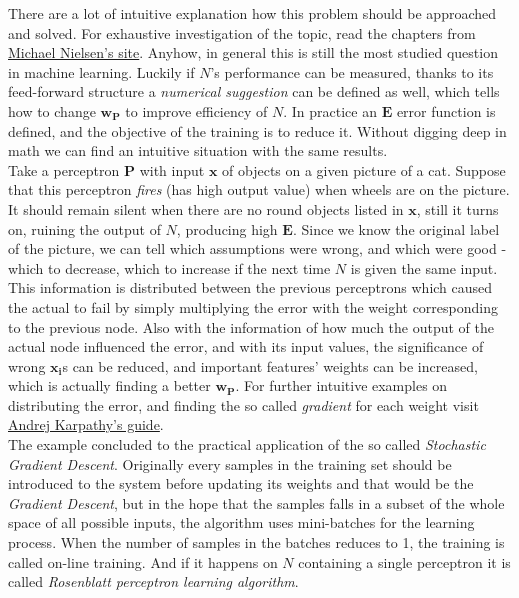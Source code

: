 There are a lot of intuitive explanation how this problem should be approached and solved. For exhaustive investigation of the topic, read the chapters from \href{http://neuralnetworksanddeeplearning.com/}{Michael Nielsen's site}. 
Anyhow, in general this is still the most studied question in machine learning. 
Luckily if $N$'s performance can be measured, thanks to its feed-forward structure a \emph{numerical suggestion} can be defined as well, which tells how to change $\mathbf{w_P}$ to improve efficiency of $N$. In practice an $\mathbf{E}$ error function is defined, and the objective of the training is to reduce it. Without digging deep in math we can find an intuitive situation with the same results.\\

Take a perceptron $\mathbf{P}$ with input $\mathbf{x}$ of objects on a given picture of a cat. Suppose that this perceptron \emph{fires} (has high output value) when wheels are on the picture. It should remain silent when there are no round objects listed in 
$\mathbf{x}$, still it turns on, ruining the output of $N$, producing high $\mathbf{E}$.
Since we know the original label of the picture, we can tell which assumptions were wrong, and which were good - which to decrease, which to increase if the next time $N$ is given the same input. This information is distributed between the previous perceptrons which caused the actual to fail by simply multiplying the error with the weight corresponding to the previous node. Also with the information of how much the output of the actual node influenced the error, and with its input values, the significance of wrong $\mathbf{x_i}$s can be reduced, and important features' weights can be increased, which is actually finding a better $\mathbf{w_P}$. For further intuitive examples on distributing the error, and finding the so called \emph{gradient} for each weight visit \href{http://karpathy.github.io/neuralnets/}{Andrej Karpathy's guide}.\\

The example concluded to the practical application of the so called \emph{Stochastic Gradient Descent}. Originally every samples in the training set should be introduced to the system before updating its weights and that would be the \emph{Gradient Descent}, but in  the hope that the samples falls in a subset of the whole space of all possible inputs, the algorithm uses mini-batches for the learning process. When the number of samples in the batches reduces to 1, the training is called on-line training. And if it happens on $N$ containing a single perceptron it is called \emph{Rosenblatt perceptron learning algorithm}.

